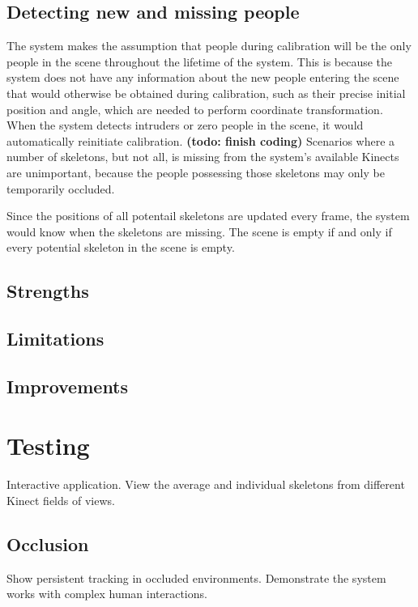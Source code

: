 \documentclass{sigchi}
\begin{document}
\subsection{Detecting new and missing people}

The system makes the assumption that people during calibration will be the only people in the scene throughout the lifetime of the system. This is because the system does not have any information about the new people entering the scene that would otherwise be obtained during calibration, such as their precise initial position and angle, which are needed to perform coordinate transformation. When the system detects intruders or zero people in the scene, it would automatically reinitiate calibration. \textbf{(todo: finish coding)} Scenarios where a number of skeletons, but not all, is missing from the system's available Kinects are unimportant, because the people possessing those skeletons may only be temporarily occluded.

Since the positions of all potentail skeletons are updated every frame, the system would know when the skeletons are missing. The scene is empty if and only if every potential skeleton in the scene is empty.

\subsection{Strengths}

\subsection{Limitations}

\subsection{Improvements}

\section{Testing}

Interactive application. View the average and individual skeletons from different Kinect fields of views.

\subsection{Occlusion}

Show persistent tracking in occluded environments. Demonstrate the system works with complex human interactions.
\end{document}
